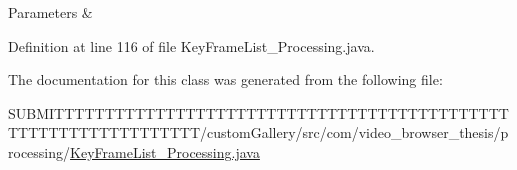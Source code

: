 \begin{DoxyParams}{Parameters}
{\em } & \\
\hline
\end{DoxyParams}


Definition at line 116 of file Key\-Frame\-List\-\_\-\-Processing.\-java.



The documentation for this class was generated from the following file\-:\begin{DoxyCompactItemize}
\item 
S\-U\-B\-M\-I\-T\-T\-T\-T\-T\-T\-T\-T\-T\-T\-T\-T\-T\-T\-T\-T\-T\-T\-T\-T\-T\-T\-T\-T\-T\-T\-T\-T\-T\-T\-T\-T\-T\-T\-T\-T\-T\-T\-T\-T\-T\-T\-T\-T\-T\-T\-T\-T\-T\-T\-T\-T\-T\-T\-T\-T\-T\-T\-T\-T\-T\-T\-T\-T/custom\-Gallery/src/com/video\-\_\-browser\-\_\-thesis/processing/\hyperlink{_key_frame_list___processing_8java}{Key\-Frame\-List\-\_\-\-Processing.\-java}\end{DoxyCompactItemize}
